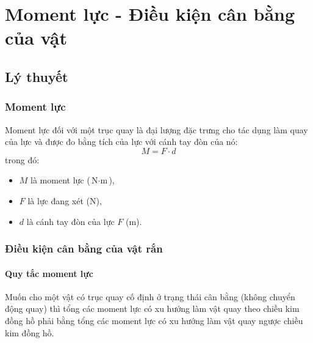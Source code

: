 \let\lesson\undefined
\newcommand{\lesson}{\phantomlesson{Bài 14: Moment lực. Điều kiện cân bằng của vật.}}
\chapter[Moment lực - Điều kiện cân bằng của vật]{Moment lực - Điều kiện cân bằng của vật}
\setcounter{section}{0}
\section{Lý thuyết}
\subsection{Moment lực}
Moment lực đối với một trục quay là đại lượng đặc trưng cho tác dụng làm quay của lực và được đo bằng tích của lực với cánh tay đòn của nó:
\begin{equation*}
	M = F\cdot d \label{eq1}
\end{equation*}
trong đó: 
\begin{itemize}
	\item $M$ là moment lực ($\si{\newton\cdot\meter}$), 
	\item $F$ là lực đang xét ($\si{\newton}$),
	\item $d$ là cánh tay đòn của lực $F$ ($\si{\meter}$).
\end{itemize}
\subsection{Điều kiện cân bằng của vật rắn}
\subsubsection{Quy tắc moment lực}
Muốn cho một vật có trục quay cố định ở trạng thái cân bằng (không chuyển động quay) thì tổng các moment lực có xu hướng làm vật quay theo chiều kim đồng hồ phải bằng tổng các moment lực có xu hướng làm vật quay ngược chiều kim đồng hồ.

